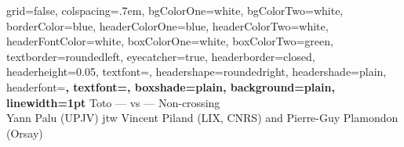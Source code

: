 \documentclass[portrait,final,a0paper,fontscale=0.25]{baposter}
\theoremstyle{definition}
\begin{document}

\begin{poster}%
  {
  grid=false,
  colspacing=.7em,
  bgColorOne=white,
  bgColorTwo=white,
  borderColor=blue,
  headerColorOne=blue,
  headerColorTwo=white,
  headerFontColor=white,
  boxColorOne=white,
  boxColorTwo=green,
  textborder=roundedleft,
  eyecatcher=true,
  headerborder=closed,
  headerheight=0.05\textheight,
  textfont=\Huge,
  headershape=roundedright,
  headershade=plain,
  headerfont=\Large\bf, %
  textfont={\setlength{\parindent}{0pt}},
  boxshade=plain,
  background=plain,
  linewidth=1pt
  }
  {Toto}
  {{\fontsize{24}{25} \; --- \; {\color{red} vs} \; --- \; {\color{blue} Non-crossing}} \\ {\Large \rm Yann Palu} {\normalsize (UPJV) jtw} {\Large \rm Vincent Piland} {\normalsize (LIX, CNRS) and} {\Large \rm Pierre-Guy Plamondon} {\normalsize (Orsay)} \vspace*{-.5cm}}
  {}
  {}
  

\end{poster}
\end{document}
